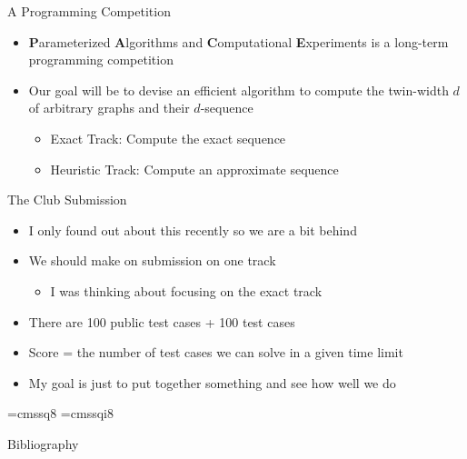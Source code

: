 \documentclass[aspectratio=169]{beamer}
\begin{document}
\begin{frame}{A Programming Competition}
    \begin{itemize}
        \item \textbf{P}arameterized \textbf{A}lgorithms and \textbf{C}omputational \textbf{E}xperiments is a long-term programming competition
        \item Our goal will be to devise an efficient algorithm to compute the twin-width $d$ of arbitrary graphs and their $d$-sequence
        \begin{itemize}
            \item Exact Track: Compute the exact sequence
            \item Heuristic Track: Compute an approximate sequence 
        \end{itemize}
    \end{itemize}
\end{frame}

\begin{frame}{The Club Submission}
    \begin{itemize}
        \item I only found out about this recently so we are a bit behind
        \item We should make on submission on one track
        \begin{itemize}
            \item I was thinking about focusing on the exact track
        \end{itemize}
        \item There are 100 public test cases + 100 test cases
        \item Score = the number of test cases we can solve in a given time limit
        \item My goal is just to put together something and see how well we do
    \end{itemize}
\end{frame}

\font\eightss=cmssq8
\font\eightssi=cmssqi8
\newcommand\quoteAuthorDate[3]{\begingroup
  \baselineskip 10pt
  \parfillskip 0pt
  \interlinepenalty 10000 %
  \leftskip 0pt plus 40pc minus \parindent
  \let\rm=\eightss
  \let\sl=\eightssi
  \everypar{\sl}#1\par
  \nobreak\smallskip
  \noindent\rm--- #2\unskip\enspace(#3)\par
  \endgroup}

\begin{frame}{Bibliography}
    {\tiny }
    
\end{frame}
\end{document}
